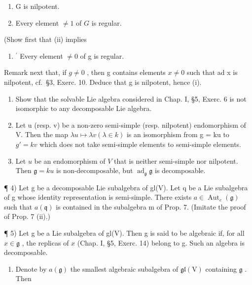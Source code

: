 \begin{enumerate}
\def\labelenumi{(\roman{enumi})}
\item
  G is nilpotent.
\item
  Every element \(\neq 1\) of \(G\) is regular.
\end{enumerate}

(Show first that (ii) implies

\begin{enumerate}
\def\labelenumi{(\roman{enumi})}
\setcounter{enumi}{1}
\tightlist
\item
  \(^{\prime}\) Every element \(\neq 0\) of g is regular.
\end{enumerate}

Remark next that, if \(g \neq 0\) , then g contains elements \(x \neq 0\) such that ad x is nilpotent, cf.~§3, Exerc. 10. Deduce that g is nilpotent, hence (i).


\begin{enumerate}
\def\labelenumi{\arabic{enumi})}
\item
  Show that the solvable Lie algebra considered in Chap. I, §5, Exerc. 6 is not isomorphic to any decomposable Lie algebra.
\item
  Let u (resp. v) be a non-zero semi-simple (resp. nilpotent) endomorphism of V. Then the map \(\lambda u \mapsto \lambda v (\lambda \in k)\) is an isomorphism from g = ku to \(g' = kv\) which does not take semi-simple elements to semi-simple elements.
\item
  Let \(u\) be an endomorphism of \(V\) that is neither semi-simple nor nilpotent. Then \(\mathfrak{g} = ku\) is non-decomposable, but \(\operatorname{ad}_{\mathfrak{g}}\mathfrak{g}\) is decomposable.
\end{enumerate}

¶ 4) Let g be a decomposable Lie subalgebra of gl(V). Let q be a Lie subalgebra of g whose identity representation is semi-simple. There exists \(a \in \operatorname{Aut}_{e}(\mathfrak{g})\) such that \(a(\mathfrak{q})\) is contained in the subalgebra m of Prop. 7. (Imitate the proof of Prop. 7 (ii).)

¶ 5) Let g be a Lie subalgebra of gl(V). Then g is said to be algebraic if, for all \(x \in \mathfrak{g}\) , the replicas of \(x\) (Chap. I, §5, Exerc. 14) belong to g. Such an algebra is decomposable.

\begin{enumerate}
\def\labelenumi{\alph{enumi})}
\tightlist
\item
  Denote by \(a(\mathfrak{g})\) the smallest algebraic subalgebra of \(\mathfrak{gl}(\mathrm{V})\) containing \(\mathfrak{g}\) . Then
\end{enumerate}

